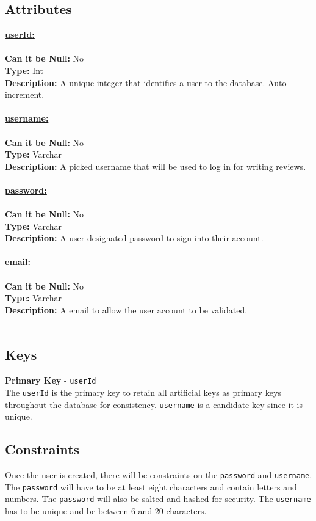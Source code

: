 \subsection{Attributes}
\textbf{\underline{userId:}}\\
\\
\textbf{Can it be Null:} No\\
\textbf{Type:} Int \\
\textbf{Description:} 
A unique integer that identifies a user to the database. Auto increment.\\\\
\textbf{\underline{username:}}\\
\\
\textbf{Can it be Null:} No \\
\textbf{Type:} Varchar\\
\textbf{Description:} A picked username that will be used to log in 
for writing reviews.\\\\
\textbf{\underline{password:}}\\
\\
\textbf{Can it be Null:} No\\
\textbf{Type:} Varchar\\
\textbf{Description:} A user designated password to sign into their account.\\\\
\textbf{\underline{email:}}\\
\\
\textbf{Can it be Null:} No\\
\textbf{Type:} Varchar\\
\textbf{Description:} A email to allow the user account to be validated. \\\\
\subsection{Keys}
\textbf{Primary Key} - \texttt{userId}\\
The \texttt{userId} is the primary key to retain all artificial keys as 
primary keys throughout the database for consistency. \texttt{username} is a candidate key since it is unique.

\subsection{Constraints} 
Once the user is created, there will be constraints on the \texttt{password} and \texttt{username}.
The \texttt{password} will have to be at least eight characters and contain letters and numbers.
The \texttt{password} will also be salted and hashed for security.
The \texttt{username} has to be unique and be between 6 and 20 characters. 





